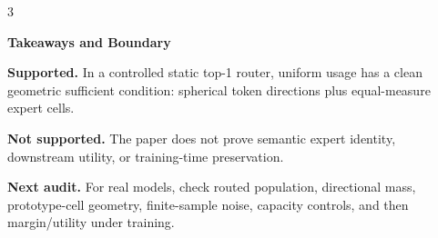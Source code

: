 \documentclass[17pt]{extarticle}
\newcommand{\panel}[2]{%
  \noindent\colorbox{panel}{%
    \begin{minipage}{0.96\linewidth}
    \vspace{0.18in}
    {\color{accent}\bfseries\Large #1}\par\vspace{0.12in}
    #2
    \vspace{0.12in}
    \end{minipage}}
  \vspace{0.22in}
}
\begin{document}
\begin{multicols}{3}
\panel{Takeaways and Boundary}{
\large
\textbf{Supported.} In a controlled static top-1 router, uniform usage has a
clean geometric sufficient condition: spherical token directions plus
equal-measure expert cells.

\vspace{0.1in}
\textbf{Not supported.} The paper does not prove semantic expert identity,
downstream utility, or training-time preservation.

\vspace{0.1in}
\textbf{Next audit.} For real models, check routed population, directional
mass, prototype-cell geometry, finite-sample noise, capacity controls, and
then margin/utility under training.
}

\end{multicols}
\end{document}
